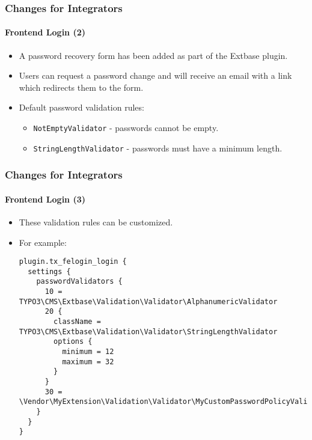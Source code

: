 
\begin{frame}[fragile]
	\frametitle{Changes for Integrators}
	\framesubtitle{Frontend Login (2)}

	\begin{itemize}

		\item A password recovery form has been added as part of the Extbase plugin.
		\item Users can request a password change and will receive an email with a link which redirects them to the form.
		\item Default password validation rules:

			\begin{itemize}
				\item \texttt{NotEmptyValidator} - passwords cannot be empty.
				\item \texttt{StringLengthValidator} - passwords must have a minimum length.
			\end{itemize}

	\end{itemize}

\end{frame}


\begin{frame}[fragile]
	\frametitle{Changes for Integrators}
	\framesubtitle{Frontend Login (3)}

	\lstset{basicstyle=\tiny\ttfamily}

	\begin{itemize}
		\item These validation rules can be customized.
		\item For example:
\begin{lstlisting}
plugin.tx_felogin_login {
  settings {
    passwordValidators {
      10 = TYPO3\CMS\Extbase\Validation\Validator\AlphanumericValidator
      20 {
        className = TYPO3\CMS\Extbase\Validation\Validator\StringLengthValidator
        options {
          minimum = 12
          maximum = 32
        }
      }
      30 = \Vendor\MyExtension\Validation\Validator\MyCustomPasswordPolicyValidator
    }
  }
}
\end{lstlisting}

	\end{itemize}

\end{frame}

